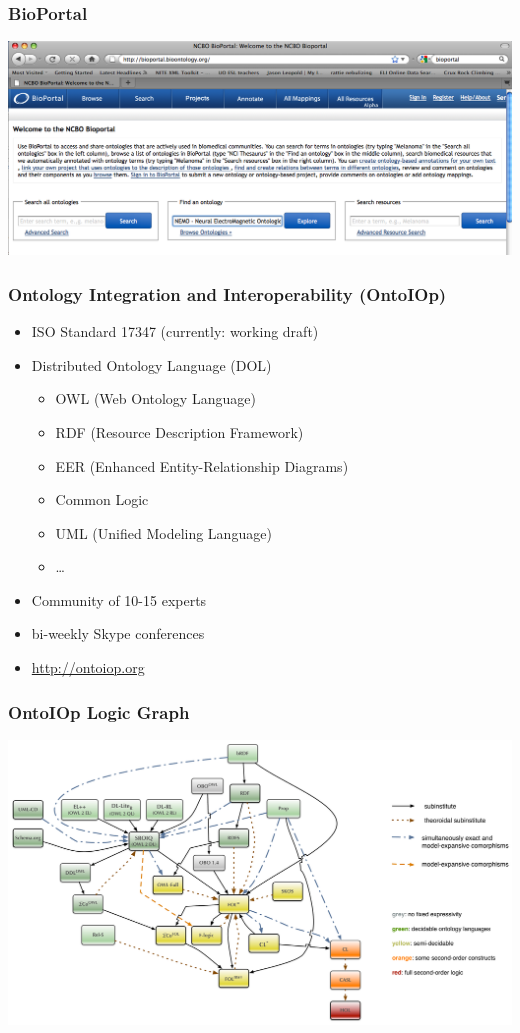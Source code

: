 \documentclass[german]{beamer}
\begin{document}
\begin{frame}
\frametitle{BioPortal}
\includegraphics[width=\textwidth]{Screenshot_Bioportal.png}
\end{frame}

\begin{frame}
\frametitle{Ontology Integration and Interoperability (OntoIOp)}
\begin{itemize}
\item ISO Standard 17347 (currently: working draft)
\item Distributed Ontology Language (DOL)
\begin{itemize}
\item OWL (Web Ontology Language)
\item RDF (Resource Description Framework)
\item EER (Enhanced Entity-Relationship Diagrams)
\item Common Logic
\item UML (Unified Modeling Language)
\item \ldots
\end{itemize}
\item Community of 10-15 experts
\item bi-weekly Skype conferences
\item \url{http://ontoiop.org}
\end{itemize}
\end{frame}

\begin{frame}
\frametitle{OntoIOp Logic Graph}
\includegraphics[width=\textwidth]{ontograph}
\end{frame}
\end{document}
